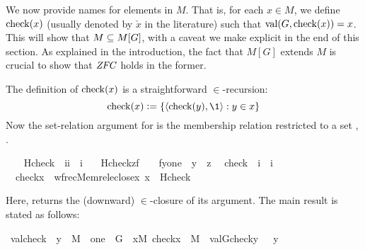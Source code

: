 
We now provide names for elements in $M$. That is, for each $x\in M$,
we define $\operatorname{check}(x)$ (usually denoted by $\check{x}$ in the literature)
such that $\operatorname{val}(G,\operatorname{check}(x))=x$. This will show that $M\subseteq M[G]$, with
a caveat we make explicit in the end of this section. As explained in
the introduction, the fact that $M[G]$ extends $M$ is crucial to show
that $\mathit{ZFC}$ holds in the former.

The definition of $\operatorname{check}(x)$ is a straightforward $\in$-recursion:
\begin{equation}
  \label{eq:def-check}
  \chk(x)\defi\{\lb\chk(y),\1\rb : y\in x\}
\end{equation}
Now the set-relation argument for  is the membership
relation restricted to a set , .

\begin{isabelle}
\isamarkupfalse%
\ \isanewline
\ \ Hcheck\ {\isacharcolon}{\isacharcolon}\ {\isachardoublequoteopen}{\isacharbrackleft}i{\isacharcomma}i{\isacharbrackright}\ {\isasymRightarrow}\ i{\isachardoublequoteclose}\ \isanewline
\ \ {\isachardoublequoteopen}Hcheck{\isacharparenleft}z{\isacharcomma}f{\isacharparenright}\ \ {\isacharequal}{\isacharequal}\ {\isacharbraceleft}\ {\isacharless}f{\isacharbackquote}y{\isacharcomma}one{\isachargreater}\ {\isachardot}\ y\ {\isasymin}\ z{\isacharbraceright}{\isachardoublequoteclose}\isanewline
\isanewline
{}\isamarkupfalse%
\isanewline
\ \ check\ {\isacharcolon}{\isacharcolon}\ {\isachardoublequoteopen}i\ {\isasymRightarrow}\ i{\isachardoublequoteclose}\ \isanewline
\ \ {\isachardoublequoteopen}check{\isacharparenleft}x{\isacharparenright}\ {\isacharequal}{\isacharequal}\ wfrec{\isacharparenleft}Memrel{\isacharparenleft}eclose{\isacharparenleft}{\isacharbraceleft}x{\isacharbraceright}{\isacharparenright}{\isacharparenright}{\isacharcomma}\ x\ {\isacharcomma}\ Hcheck{\isacharparenright}{\isachardoublequoteclose}
\end{isabelle}
Here,  returns the (downward) $\in$-closure of its
argument. The main result is stated as follows:

\begin{isabelle}
\isamarkupfalse%
\ valcheck\ {\isacharcolon}\ {\isachardoublequoteopen}y\ {\isasymin}\ M\ {\isasymLongrightarrow}\ one\ {\isasymin}\ G\ {\isasymLongrightarrow}\ {\isasymforall}x{\isasymin}M{\isachardot}\ check{\isacharparenleft}x{\isacharparenright}\ {\isasymin}\ M\ {\isasymLongrightarrow}\ val{\isacharparenleft}G{\isacharcomma}check{\isacharparenleft}y{\isacharparenright}{\isacharparenright}\ \ {\isacharequal}\ y{\isachardoublequoteclose}
\end{isabelle}

